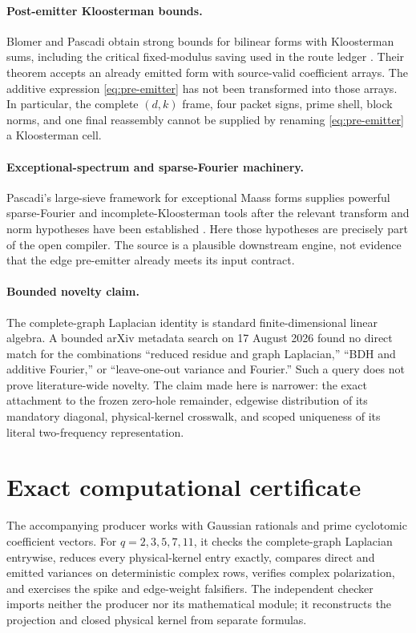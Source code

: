 \documentclass[11pt]{article}
\begin{document}
\paragraph{Post-emitter Kloosterman bounds.}
Blomer and Pascadi obtain strong bounds for bilinear forms with Kloosterman
sums, including the critical fixed-modulus saving used in the route ledger
\cite{BlomerPascadi2026}.  Their theorem accepts an already emitted form with
source-valid coefficient arrays.  The additive expression
\eqref{eq:pre-emitter} has not been transformed into those arrays.  In
particular, the complete $(d,k)$ frame, four packet signs, prime shell, block
norms, and one final reassembly cannot be supplied by renaming
\eqref{eq:pre-emitter} a Kloosterman cell.

\paragraph{Exceptional-spectrum and sparse-Fourier machinery.}
Pascadi's large-sieve framework for exceptional Maass forms supplies powerful
sparse-Fourier and incomplete-Kloosterman tools after the relevant transform
and norm hypotheses have been established \cite{Pascadi2026LargeSieve}.
Here those hypotheses are precisely part of the open compiler.  The source is
a plausible downstream engine, not evidence that the edge pre-emitter already
meets its input contract.

\paragraph{Bounded novelty claim.}
The complete-graph Laplacian identity is standard finite-dimensional linear
algebra.  A bounded arXiv metadata search on 17 August 2026 found no direct
match for the combinations ``reduced residue and graph Laplacian,'' ``BDH and
additive Fourier,'' or ``leave-one-out variance and Fourier.''  Such a query
does not prove literature-wide novelty.  The claim made here is narrower: the
exact attachment to the frozen zero-hole remainder, edgewise distribution of
its mandatory diagonal, physical-kernel crosswalk, and scoped uniqueness of
its literal two-frequency representation.

\section{Exact computational certificate}

The accompanying producer works with Gaussian rationals and prime
cyclotomic coefficient vectors.  For $q=2,3,5,7,11$, it checks the
complete-graph Laplacian entrywise, reduces every physical-kernel entry
exactly, compares direct and emitted variances on deterministic complex rows,
verifies complex polarization, and exercises the spike and edge-weight
falsifiers.  The independent checker imports neither the producer nor its
mathematical module; it reconstructs the projection and closed physical
kernel from separate formulas.
\end{document}
